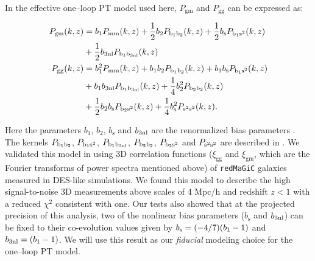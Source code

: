 \documentclass[aps, prd,twocolumn,superscriptaddress,nofootinbib,preprintnumbers]{revtex4-1}
\newcommand{\xigg}{\ensuremath{\xi_{\mathrm{gg}}} }
\newcommand{\xigm}{\ensuremath{\xi_{\mathrm{gm}}} }
\newcommand{\redmagic}{\texttt{redMaGiC} }
\begin{document}
In the effective one--loop PT model used here, $P_{\mathrm{gm}}$ and $P_{\mathrm{gg}}$ can be expressed as:
\begin{linenomath*}
\begin{align}\label{eq:P_gg_gm}
    P_{\mathrm{gm}}(k, z) &= b_1 P_{\mathrm{mm}}(k, z) +  \frac{1}{2} b_2 P_{\rm b_1 b_2}(k, z) + \frac{1}{2} b_{\mathrm{s}} P_{\rm b_1 s^2}(k, z) \nonumber  \\
    & + \frac{1}{2} b_{\rm 3nl}P_{\rm b_1 b_{\rm 3nl}}(k, z) \\
    P_{\mathrm{gg}}(k, z) &= b_1^2 P_{\mathrm{mm}}(k, z) + b_1 b_2 P_{\rm b_1 b_2}(k, z) + b_1 b_{\mathrm{s}}P_{\rm b_1 s^2}(k, z) \nonumber \\ 
    & + b_1b_{\rm 3nl} P_{\rm b_1 b_{\rm 3nl} }(k, z) + \frac{1}{4}b_2^2 P_{\rm b_2 b_2}(k, z)  \nonumber \\
    &  + \frac{1}{2} b_2 b_{\mathrm{s}}P_{\rm b_2 s^2}(k, z) + \frac{1}{4} b^2_{\mathrm{s}} P_{\rm s^2 s^2}(k, z).  
\end{align}
\end{linenomath*}
Here the parameters $ b_1 $, $ b_2 $, $ b_{\mathrm{s}} $ and $ b_{\rm 3nl} $ are the renormalized bias parameters \citep{McDonald2009}. The kernels $P_{\rm b_1 b_2}$, $P_{\rm b_1 s^2}$, $P_{\rm b_1 b_{\rm 3nl}}$, $P_{\rm b_2 b_2}$, $P_{\rm b_2 s^2}$ and $P_{\rm s^2 s^2}$ are described in \cite{Saito2014a}. We validated this model in \cite{p2020perturbation} using 3D correlation functions ($\xigg$ and $\xigm$, which are the Fourier transforms of power spectra mentioned above) of \redmagic galaxies measured in DES-like simulations. We found this model to describe the high signal-to-noise 3D measurements above scales of 4 Mpc/h and redshift $z < 1$ with a reduced $\chi^2$ consistent with one. Our tests also showed that at the projected precision of this analysis, two of the nonlinear bias parameters ($ b_{\mathrm{s}} $ and $ b_{\rm 3nl} $) can be fixed to their co-evolution values given by $b_{\rm s} = (-4/7) (b_1 - 1)$ and $b_{\rm 3nl} = (b_1 - 1)$. We will use this result as our \textit{fiducial} modeling choice for the one--loop PT model. 

\end{document}
